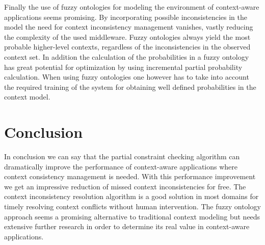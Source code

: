 \documentclass[journal]{vgtc}                %
\begin{document}
Finally the use of fuzzy ontologies for modeling the environment of context-aware applications seems promising. By incorporating possible inconsistencies in the model the need for context inconsistency management vanishes, vastly reducing the complexity of the used middleware. Fuzzy ontologies always yield the most probable higher-level contexts, regardless of the inconsistencies in the observed context set. In addition the calculation of the probabilities in a fuzzy ontology has great potential for optimization by using incremental partial probability calculation. 
When using fuzzy ontologies one however has to take into account the required training of the system for obtaining well defined probabilities in the context model. 

\section{Conclusion}
In conclusion we can say that the partial constraint checking algorithm can dramatically improve the performance of context-aware applications where context consistency management is needed. With this performance improvement we get an impressive reduction of missed context inconsistencies for free. The context inconsistency resolution algorithm is a good solution in most domains for timely resolving context conflicts without human intervention. The fuzzy ontology approach seems a promising alternative to traditional context modeling but needs extensive further research in order to determine its real value in context-aware applications.



\newpage
\appendix
\end{document}
